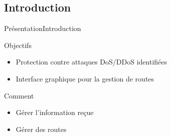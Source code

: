 \subsection{Introduction}

\begin{frame}{Présentation}{Introduction}

\begin{block}{Objectifs}
    \begin{itemize}
        \item Protection contre attaques DoS/DDoS identifiées
        \item Interface graphique pour la gestion de routes
    \end{itemize}
\end{block}
\begin{exampleblock}{Comment}
    \begin{itemize}
        \item Gérer l'information reçue
        \item Gérer des routes
    \end{itemize}    
\end{exampleblock}

\end{frame}